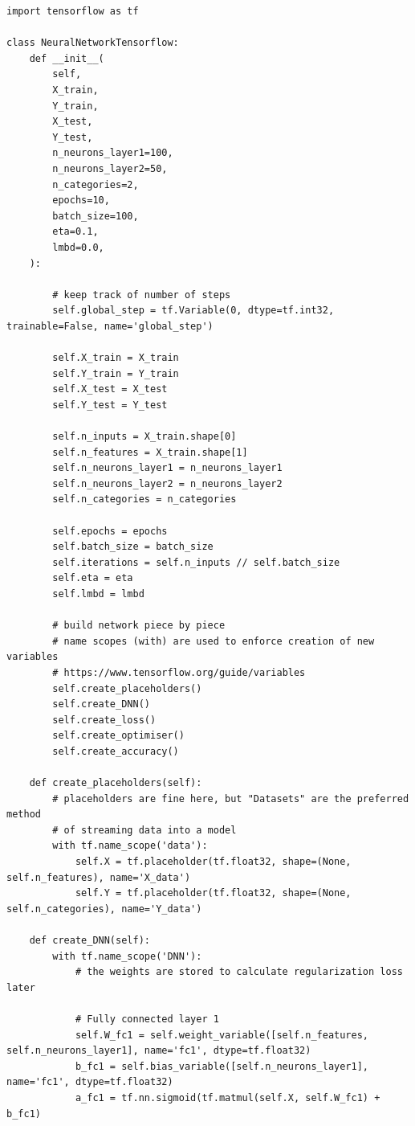 \documentclass[%
oneside,                 %
final,                   %
10pt]{article}
\begin{document}
\noindent
\begin{verbatim}
import tensorflow as tf

class NeuralNetworkTensorflow:
    def __init__(
        self,
        X_train,
        Y_train,
        X_test,
        Y_test,
        n_neurons_layer1=100,
        n_neurons_layer2=50,
        n_categories=2,
        epochs=10,
        batch_size=100,
        eta=0.1,
        lmbd=0.0,
    ):
        
        # keep track of number of steps
        self.global_step = tf.Variable(0, dtype=tf.int32, trainable=False, name='global_step')
        
        self.X_train = X_train
        self.Y_train = Y_train
        self.X_test = X_test
        self.Y_test = Y_test
        
        self.n_inputs = X_train.shape[0]
        self.n_features = X_train.shape[1]
        self.n_neurons_layer1 = n_neurons_layer1
        self.n_neurons_layer2 = n_neurons_layer2
        self.n_categories = n_categories
        
        self.epochs = epochs
        self.batch_size = batch_size
        self.iterations = self.n_inputs // self.batch_size
        self.eta = eta
        self.lmbd = lmbd
        
        # build network piece by piece
        # name scopes (with) are used to enforce creation of new variables
        # https://www.tensorflow.org/guide/variables
        self.create_placeholders()
        self.create_DNN()
        self.create_loss()
        self.create_optimiser()
        self.create_accuracy()
    
    def create_placeholders(self):
        # placeholders are fine here, but "Datasets" are the preferred method
        # of streaming data into a model
        with tf.name_scope('data'):
            self.X = tf.placeholder(tf.float32, shape=(None, self.n_features), name='X_data')
            self.Y = tf.placeholder(tf.float32, shape=(None, self.n_categories), name='Y_data')
    
    def create_DNN(self):
        with tf.name_scope('DNN'):
            # the weights are stored to calculate regularization loss later
            
            # Fully connected layer 1
            self.W_fc1 = self.weight_variable([self.n_features, self.n_neurons_layer1], name='fc1', dtype=tf.float32)
            b_fc1 = self.bias_variable([self.n_neurons_layer1], name='fc1', dtype=tf.float32)
            a_fc1 = tf.nn.sigmoid(tf.matmul(self.X, self.W_fc1) + b_fc1)
            

\end{verbatim}
\end{document}
